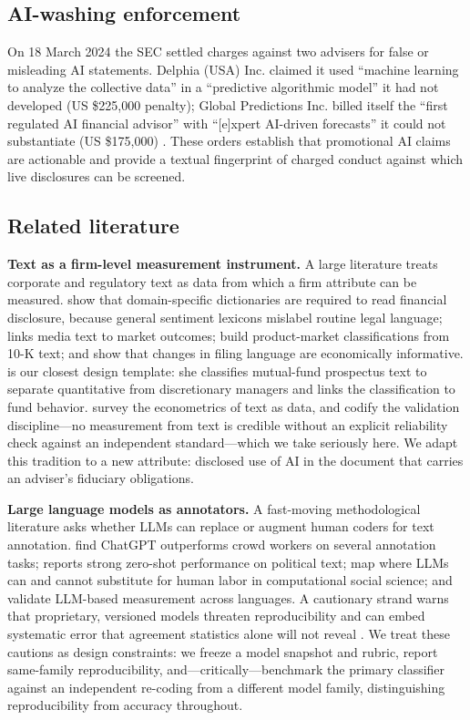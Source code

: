 \documentclass[utf8]{FrontiersinHarvard} %
\begin{document}
\subsection{AI-washing enforcement}
On 18 March 2024 the SEC settled charges against two advisers for false or misleading AI statements. Delphia (USA) Inc. claimed it used ``machine learning to analyze the collective data'' in a ``predictive algorithmic model'' it had not developed (US \$225{,}000 penalty); Global Predictions Inc. billed itself the ``first regulated AI financial advisor'' with ``[e]xpert AI-driven forecasts'' it could not substantiate (US \$175{,}000) \citep{usSEC2024a,usSEC2024b}. These orders establish that promotional AI claims are actionable and provide a textual fingerprint of charged conduct against which live disclosures can be screened.

\subsection{Related literature}
\textbf{Text as a firm-level measurement instrument.} A large literature treats corporate and regulatory text as data from which a firm attribute can be measured. \citet{loughran2011,loughran2016} show that domain-specific dictionaries are required to read financial disclosure, because general sentiment lexicons mislabel routine legal language; \citet{tetlock2007} links media text to market outcomes; \citet{hoberg2016} build product-market classifications from 10-K text; and \citet{cohenLazy2020} show that changes in filing language are economically informative. \citet{abis2022} is our closest design template: she classifies mutual-fund prospectus text to separate quantitative from discretionary managers and links the classification to fund behavior. \citet{gentzkow2019} survey the econometrics of text as data, and \citet{grimmer2013} codify the validation discipline---no measurement from text is credible without an explicit reliability check against an independent standard---which we take seriously here. We adapt this tradition to a new attribute: disclosed use of AI in the document that carries an adviser's fiduciary obligations.

\textbf{Large language models as annotators.} A fast-moving methodological literature asks whether LLMs can replace or augment human coders for text annotation. \citet{gilardi2023} find ChatGPT outperforms crowd workers on several annotation tasks; \citet{tornberg2023} reports strong zero-shot performance on political text; \citet{ziems2024} map where LLMs can and cannot substitute for human labor in computational social science; and \citet{rathje2024} validate LLM-based measurement across languages. A cautionary strand warns that proprietary, versioned models threaten reproducibility and can embed systematic error that agreement statistics alone will not reveal \citep{ollion2024,bommasani2021}. We treat these cautions as design constraints: we freeze a model snapshot and rubric, report same-family reproducibility, and---critically---benchmark the primary classifier against an independent re-coding from a different model family, distinguishing reproducibility from accuracy throughout.
\end{document}
